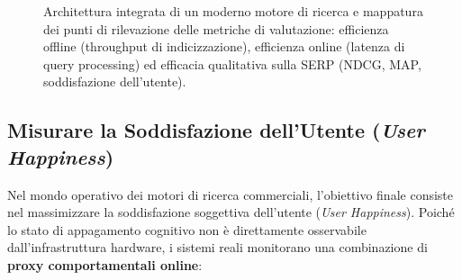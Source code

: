\begin{figure}[H]
{%
}
\caption{Architettura integrata di un moderno motore di ricerca e mappatura dei punti di rilevazione delle metriche di valutazione: efficienza offline (throughput di indicizzazione), efficienza online (latenza di query processing) ed efficacia qualitativa sulla SERP (NDCG, MAP, soddisfazione dell'utente).}
\label{fig:architettura-valutazione}
\end{figure}

\FloatBarrier
\subsection{Misurare la Soddisfazione dell'Utente (\textit{User Happiness})}
\label{subsec:misurare-felicita-utente}

Nel mondo operativo dei motori di ricerca commerciali, l'obiettivo finale consiste nel massimizzare la soddisfazione soggettiva dell'utente (\textit{User Happiness}). Poiché lo stato di appagamento cognitivo non \`e direttamente osservabile dall'infrastruttura hardware, i sistemi reali monitorano una combinazione di \textbf{proxy comportamentali online}:

